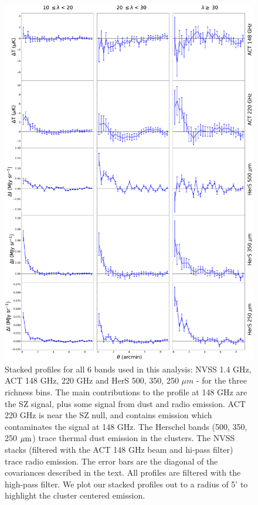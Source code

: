 \documentclass[a4paper,fleqn,usenatbib]{mnras}
\begin{document}
\begin{figure}
  \centering
  \includegraphics[height=0.9 \textheight]{5panel_rawprofs_all_stacks_all_rbin.pdf}

\caption{Stacked profiles for all 6 bands used in this analysis: NVSS 1.4 GHz, ACT 148 GHz, 220 GHz and HerS 500, 350, 250 $\mu m$ - for the three richness bins. 
The main contributions to the profile at 148 GHz are the SZ signal, plus some signal from dust and radio emission. 
ACT 220 GHz is near the SZ null, and contains emission which contaminates the signal at 148 GHz. 
The Herschel bands (500, 350, 250 $\rm \mu m$) trace thermal dust emission in the clusters. 
The NVSS stacks (filtered with the ACT 148 GHz beam and hi-pass filter) trace radio emission.  
The error bars are the diagonal of the covariances described in the text.
All profiles are filtered with the high-pass filter.
We plot our stacked profiles out to a radius of 5' to highlight the cluster centered emission.}  
  \label{fig:rawstacks}
\end{figure}
\end{document}
